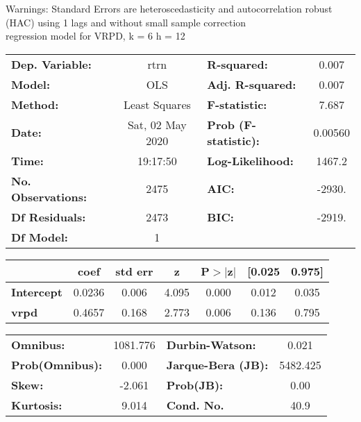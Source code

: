 Warnings: \newline
 [1] Standard Errors are heteroscedasticity and autocorrelation robust (HAC) using 1 lags and without small sample correction\\ 

regression model for VRPD, k = 6 h = 12\begin{center}
\begin{tabular}{lclc}
\toprule
\textbf{Dep. Variable:}    &       rtrn       & \textbf{  R-squared:         } &     0.007   \\
\textbf{Model:}            &       OLS        & \textbf{  Adj. R-squared:    } &     0.007   \\
\textbf{Method:}           &  Least Squares   & \textbf{  F-statistic:       } &     7.687   \\
\textbf{Date:}             & Sat, 02 May 2020 & \textbf{  Prob (F-statistic):} &  0.00560    \\
\textbf{Time:}             &     19:17:50     & \textbf{  Log-Likelihood:    } &    1467.2   \\
\textbf{No. Observations:} &        2475      & \textbf{  AIC:               } &    -2930.   \\
\textbf{Df Residuals:}     &        2473      & \textbf{  BIC:               } &    -2919.   \\
\textbf{Df Model:}         &           1      & \textbf{                     } &             \\
\bottomrule
\end{tabular}
\begin{tabular}{lcccccc}
                   & \textbf{coef} & \textbf{std err} & \textbf{z} & \textbf{P$> |$z$|$} & \textbf{[0.025} & \textbf{0.975]}  \\
\midrule
\textbf{Intercept} &       0.0236  &        0.006     &     4.095  &         0.000        &        0.012    &        0.035     \\
\textbf{vrpd}      &       0.4657  &        0.168     &     2.773  &         0.006        &        0.136    &        0.795     \\
\bottomrule
\end{tabular}
\begin{tabular}{lclc}
\textbf{Omnibus:}       & 1081.776 & \textbf{  Durbin-Watson:     } &    0.021  \\
\textbf{Prob(Omnibus):} &   0.000  & \textbf{  Jarque-Bera (JB):  } & 5482.425  \\
\textbf{Skew:}          &  -2.061  & \textbf{  Prob(JB):          } &     0.00  \\
\textbf{Kurtosis:}      &   9.014  & \textbf{  Cond. No.          } &     40.9  \\
\bottomrule
\end{tabular}
\end{center}

